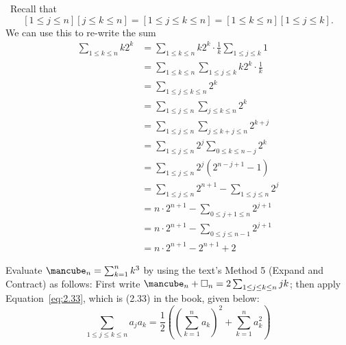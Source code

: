 \documentclass[12pt]{article}
\newenvironment{ex}[2][Exercise]{\begin{trivlist}
		\item[\hskip \labelsep {\bfseries #1}\hskip \labelsep {\bfseries #2.}]}{\end{trivlist}}
\newenvironment{sol}[1][Solution]{\begin{trivlist}
		\item[\hskip \labelsep {\bfseries #1:}]}{\end{trivlist}}
\begin{document}
\begin{sol}
	\
	 Recall that
	 \[
	 [1\leq j\leq n][j\leq k\leq n]=[1\leq j \leq k \leq n]=[1\leq k \leq n] [1\leq j \leq k].
	 \]
	 We can use this to re-write the sum
	 \begin{align*}
	 	\sum_{1\leq k\leq n}k2^k&=\sum_{1\leq k\leq n}k2^k\cdot \frac{1}{k}\sum_{1\leq j\leq k}1\\
	 	&=\sum_{1\leq k\leq n}\sum_{1\leq j\leq k}k2^k\cdot \frac{1}{k}\\
	 	&=\sum_{1\leq j\leq k\leq n}2^k\\
	 	&=\sum_{1\leq j\leq n}\sum_{j\leq k\leq n}2^k\\
	 	&=\sum_{1\leq j\leq n}\sum_{j\leq k + j\leq n}2^{k+j}\\
	 	&=\sum_{1\leq j\leq n}2^{j}\sum_{0\leq k\leq n-j}2^k\\
	 	&=\sum_{1\leq j\leq n}2^{j}(2^{n-j+1}-1)\\
	 	&=\sum_{1\leq j\leq n}2^{n+1}-\sum_{1\leq j\leq n}2^{j}\\
	 	&=n\cdot 2^{n+1}- \sum_{0\leq j+1\leq n}2^{j+1}\\
	 	&=n\cdot 2^{n+1}- \sum_{0\leq j\leq n-1}2^{j+1}\\
	 	&=n\cdot 2^{n+1}-2^{n+1}+2
	 \end{align*}
\end{sol}

\begin{ex}{15}
	Evaluate $\text{\mancube}_n=\sum_{k=1}^{n}k^3$ by using the text's Method 5 (Expand and Contract)
	as follows: First write $\text{\mancube}_n+\square_n=2\sum_{1\leq j\leq k\leq n}jk$; then apply
	Equation~\ref{eq:2.33}, which is (2.33) in the book, given below:
	\begin{equation}\label{eq:2.33}
			\sum_{1\leq j\leq k\leq n}a_ja_k=\frac{1}{2}\left(
		\left(\sum_{k=1}^{n}a_k\right)^2
		+\sum_{k=1}^{n}a_k^2
		\right)
	\end{equation}
\end{ex}
\end{document}
